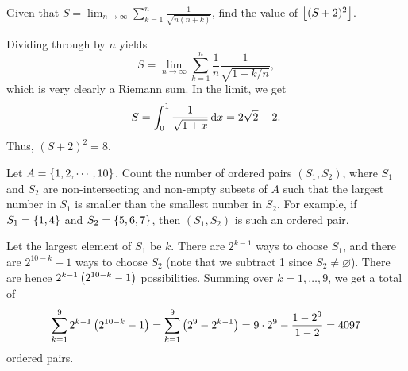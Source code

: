 \begin{question}[8]\label{A::2020-O-1-10}
    Given that $S = \displaystyle\lim_{n \to \infty} \sum_{k=1}^n \frac{1}{\sqrt{n(n+k)}}$, find the value of $\left\lfloor (S+2)^2 \right\rfloor$.
\end{question}
\begin{solution*}
    Dividing through by $n$ yields \[S = \lim_{n \to \infty} \sum_{k=1}^n \frac1{n} \frac{1}{\sqrt{1 + k/n}},\] which is very clearly a Riemann sum. In the limit, we get \[S = \int_0^1 \frac1{\sqrt{1 + x}} \mathop{\mathrm{d}x} = 2\sqrt2 - 2.\] Thus, $(S + 2)^2 = 8$.
\end{solution*}

\begin{question}[4097]\label{A::2020-O-1-11}
    Let $A = \left\lbrace 1, 2, \cdots, 10 \right\rbrace$. Count the number of ordered pairs $(S_1, S_2)$, where $S_1$ and $S_2$ are non-intersecting and non-empty subsets of $A$ such that the largest number in $S_1$ is smaller than the smallest number in $S_2$. For example, if $S_1 = \left\lbrace 1, 4 \right\rbrace$ and $S_2 = \left\lbrace 5, 6, 7 \right\rbrace$, then $(S_1, S_2)$ is such an ordered pair.
\end{question}
\begin{solution*}
    Let the largest element of $S_1$ be $k$. There are $2^{k-1}$ ways to choose $S_1$, and there are $2^{10-k} - 1$ ways to choose $S_2$ (note that we subtract 1 since $S_2 \neq \varnothing$). There are hence $2^{k-1} \left( 2^{10-k} - 1 \right)$ possibilities. Summing over $k = 1, \ldots, 9$, we get a total of \[\sum_{k=1}^9 2^{k-1} \left( 2^{10-k} - 1 \right) = \sum_{k=1}^9 \left( 2^9 - 2^{k-1} \right) = 9 \cdot 2^9 - \frac{1-2^9}{1-2} = 4097\] ordered pairs.
\end{solution*}

